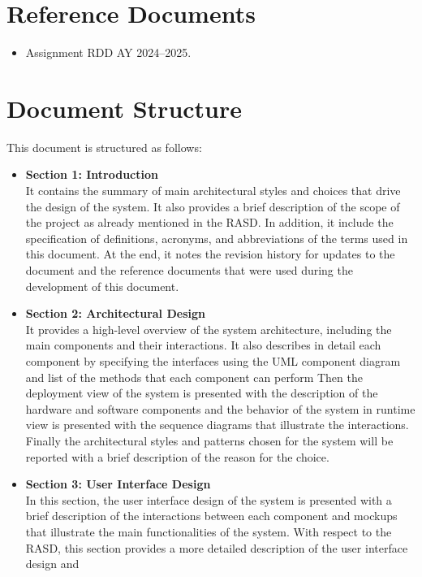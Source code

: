 \section{Reference Documents}\label{sec:reference documents}
\begin{itemize}
    \item Assignment RDD AY 2024–2025.
\end{itemize}

\section{Document Structure}\label{sec:structure}
This document is structured as follows:
\begin{itemize}
    \item \textbf{Section 1: Introduction} 
    \\It contains the summary of main architectural styles and choices that drive the design of the system. It also provides a brief description of the scope of the 
    project as already mentioned in the RASD. In addition, it include the specification of definitions, acronyms, and abbreviations of the terms used in this document. 
    At the end, it notes the revision history for updates to the document and the reference documents that were used during the development of this document.
    \item \textbf{Section 2: Architectural Design} 
    \\It provides a high-level overview of the system architecture, including the main components and their interactions. It also describes in detail each component
    by specifying the interfaces using the UML component diagram and list of the methods that each component can perform
    Then the deployment view of the system is presented with the description of the hardware and software components and the behavior of the system in runtime view 
    is presented with the sequence diagrams that illustrate the interactions. Finally the architectural styles and patterns chosen for the system will be 
    reported with a brief description of the reason for the choice.
    \item \textbf{Section 3: User Interface Design}
    \\In this section, the user interface design of the system is presented with a brief description of the interactions between each component and mockups that 
    illustrate the main functionalities of the system. With respect to the RASD, this section provides a more detailed description of the user interface design and 

\end{itemize}

